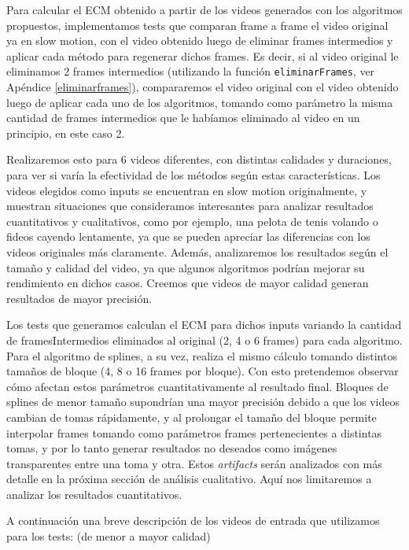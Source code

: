 \par Para calcular el ECM obtenido a partir de los videos generados con los algoritmos propuestos, implementamos tests que comparan frame a frame el video original ya en slow motion, con el video obtenido luego de eliminar frames intermedios y aplicar cada método para regenerar dichos frames. Es decir, si al video original le eliminamos 2 frames intermedios (utilizando la función \texttt{eliminarFrames}, ver Apéndice \ref{eliminarframes}), compararemos el video original con el video obtenido luego de aplicar cada uno de los algoritmos, tomando como parámetro la misma cantidad de frames intermedios que le habíamos eliminado al video en un principio, en este caso 2.
\par Realizaremos esto para 6 videos diferentes, con distintas calidades y duraciones, para ver si varía la efectividad de los métodos según estas características. Los videos elegidos como inputs se encuentran en slow motion originalmente, y muestran situaciones que consideramos interesantes para analizar resultados cuantitativos y cualitativos, como por ejemplo, una pelota de tenis volando o fideos cayendo lentamente, ya que se pueden apreciar las diferencias con los videos originales más claramente. Además, analizaremos los resultados según el tamaño y calidad del video, ya que algunos algoritmos podrían mejorar su rendimiento en dichos casos. Creemos que videos de mayor calidad generan resultados de mayor precisión.
\par Los tests que generamos calculan el ECM para dichos inputs variando la cantidad de framesIntermedios eliminados al original (2, 4 o 6 frames) para cada algoritmo. Para el algoritmo de splines, a su vez, realiza el mismo cálculo tomando distintos tamaños de bloque (4, 8 o 16 frames por bloque). Con esto pretendemos observar cómo afectan estos parámetros cuantitativamente al resultado final. Bloques de splines de menor tamaño supondrían una mayor precisión debido a que los videos cambian de tomas rápidamente, y al prolongar el tamaño del bloque permite interpolar frames tomando como parámetros frames pertenecientes a distintas tomas, y por lo tanto generar resultados no deseados como imágenes transparentes entre una toma y otra. Estos \textit{artifacts} serán analizados con más detalle en la próxima sección de análisis cualitativo. Aquí nos limitaremos a analizar los resultados cuantitativos.
\par A continuación una breve descripción de los videos de entrada que utilizamos para los tests: (de menor a mayor calidad)
